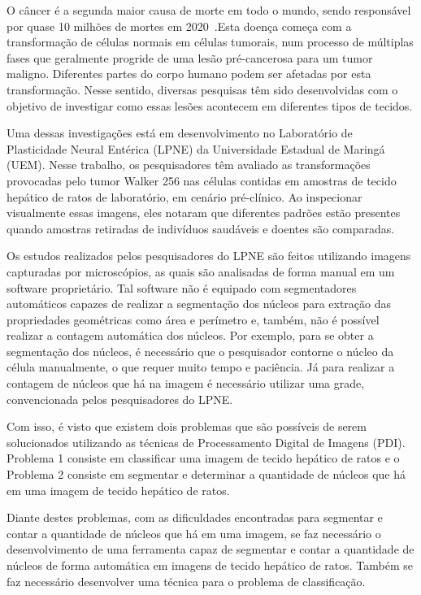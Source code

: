 O câncer é a segunda maior causa de morte em todo o mundo, sendo responsável por quase 10 milhões de mortes em 2020~\cite{ferlay2018global}.Esta doença começa com a transformação de células normais em células tumorais, num processo de múltiplas fases que geralmente progride de uma lesão pré-cancerosa para um tumor maligno. Diferentes partes do corpo humano podem ser afetadas por esta transformação. Nesse sentido, diversas pesquisas têm sido desenvolvidas com o objetivo de investigar como essas lesões acontecem em diferentes tipos de tecidos.

Uma dessas investigações está em desenvolvimento no Laboratório de Plasticidade Neural Entérica (LPNE) da Universidade Estadual de Maringá (UEM). Nesse trabalho, os pesquisadores têm avaliado as transformações provocadas pelo tumor Walker 256 nas células contidas em amostras de tecido hepático de ratos de laboratório, em cenário pré-clínico. Ao inspecionar visualmente essas imagens, eles notaram que diferentes padrões estão presentes quando amostras retiradas de indivíduos saudáveis e doentes são comparadas.

Os estudos realizados pelos pesquisadores do LPNE são feitos utilizando imagens capturadas por microscópios, as quais são analisadas de forma manual em um software proprietário. Tal software não é equipado com segmentadores automáticos capazes de realizar a segmentação dos núcleos para extração das propriedades geométricas como  área e perímetro e, também, não é possível realizar a contagem automática dos núcleos.  Por exemplo, para se obter a segmentação dos núcleos, é necessário que o pesquisador contorne o núcleo da célula manualmente, o que requer muito tempo e paciência. Já para realizar a contagem de núcleos que há na imagem é necessário utilizar uma grade, convencionada pelos pesquisadores do LPNE.

Com isso, é visto que existem dois problemas que são possíveis de serem solucionados utilizando as técnicas de Processamento Digital de Imagens (PDI). Problema 1 consiste em classificar uma imagem de tecido hepático de ratos e o Problema 2 consiste em segmentar e determinar a quantidade de núcleos que há em uma imagem de tecido hepático de ratos.

Diante destes problemas, com as dificuldades encontradas para segmentar e contar a quantidade de núcleos que há em uma imagem, se faz necessário o desenvolvimento de uma ferramenta capaz de segmentar e contar a quantidade de núcleos de forma automática em imagens de tecido hepático de ratos. Também se faz necessário desenvolver uma técnica para o problema de classificação.

